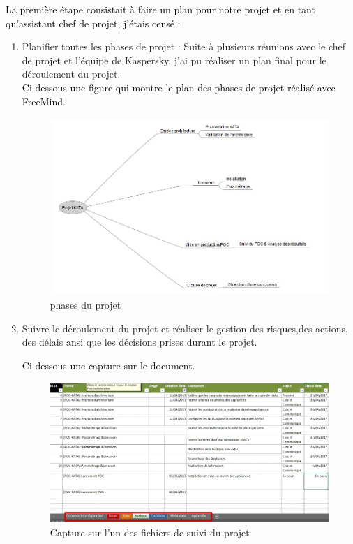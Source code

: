 \documentclass[a4paper,12pt]{report}
\begin{document}
\textcolor{black}{La première étape consistait à faire un plan pour notre projet et en tant qu’assistant chef de projet, j’étais censé :}
~~\\
\begin{enumerate}
    \item Planifier toutes les phases de projet : Suite à plusieurs réunions avec le chef de projet et l’équipe de Kaspersky, j’ai pu réaliser un plan final pour le déroulement du projet.
~~\\
\textcolor{black}{Ci-dessous une figure qui montre le plan des phases de projet réalisé avec FreeMind.}
\begin{figure}[H]
	\begin{center}
		\includegraphics[width=1\linewidth]{Projet_KATA/freeMind}
\end{center}
	\caption{phases du projet}
	\label{fig:4}	
\end{figure}
		 
\item Suivre le déroulement du projet et réaliser le gestion des risques,des actions, des délais ansi que les décisions prises durant le projet. 

\textcolor{black}{Ci-dessous une capture sur le document.}
\begin{figure}[H]
	\begin{center}
		\includegraphics[width=1\linewidth]{Projet_KATA/suiviExcel}
\end{center}
	\caption{Capture sur l'un des fichiers de suivi du projet}
	\label{fig:5}	
\end{figure}
		 

\end{enumerate}
\end{document}
